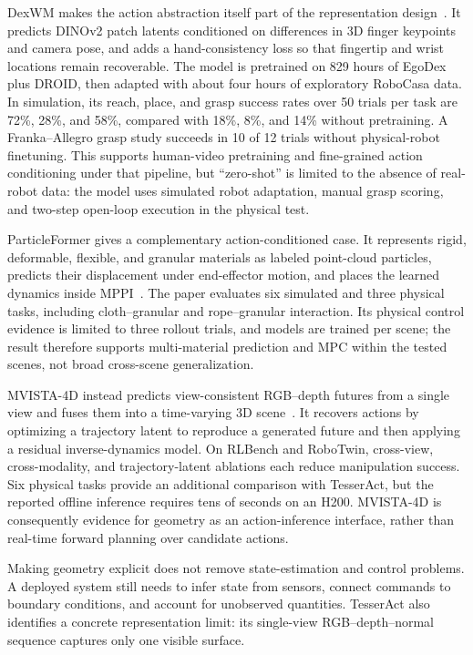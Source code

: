 DexWM makes the action abstraction itself part of the representation design~\cite{goswami2025dexwm}. It predicts DINOv2 patch latents conditioned on differences in 3D finger keypoints and camera pose, and adds a hand-consistency loss so that fingertip and wrist locations remain recoverable. The model is pretrained on 829 hours of EgoDex plus DROID, then adapted with about four hours of exploratory RoboCasa data. In simulation, its reach, place, and grasp success rates over 50 trials per task are 72\%, 28\%, and 58\%, compared with 18\%, 8\%, and 14\% without pretraining. A Franka--Allegro grasp study succeeds in 10 of 12 trials without physical-robot finetuning. This supports human-video pretraining and fine-grained action conditioning under that pipeline, but ``zero-shot'' is limited to the absence of real-robot data: the model uses simulated robot adaptation, manual grasp scoring, and two-step open-loop execution in the physical test.

ParticleFormer gives a complementary action-conditioned case. It represents rigid, deformable, flexible, and granular materials as labeled point-cloud particles, predicts their displacement under end-effector motion, and places the learned dynamics inside MPPI~\cite{huang2025particleformer}. The paper evaluates six simulated and three physical tasks, including cloth--granular and rope--granular interaction. Its physical control evidence is limited to three rollout trials, and models are trained per scene; the result therefore supports multi-material prediction and MPC within the tested scenes, not broad cross-scene generalization.

MVISTA-4D instead predicts view-consistent RGB--depth futures from a single view and fuses them into a time-varying 3D scene~\cite{wang2026mvista4d}. It recovers actions by optimizing a trajectory latent to reproduce a generated future and then applying a residual inverse-dynamics model. On RLBench and RoboTwin, cross-view, cross-modality, and trajectory-latent ablations each reduce manipulation success. Six physical tasks provide an additional comparison with TesserAct, but the reported offline inference requires tens of seconds on an H200. MVISTA-4D is consequently evidence for geometry as an action-inference interface, rather than real-time forward planning over candidate actions.

Making geometry explicit does not remove state-estimation and control problems. A deployed system still needs to infer state from sensors, connect commands to boundary conditions, and account for unobserved quantities. TesserAct also identifies a concrete representation limit: its single-view RGB--depth--normal sequence captures only one visible surface.

